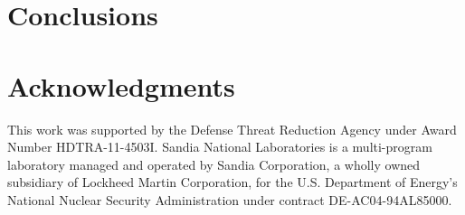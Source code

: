\documentclass[review,3p]{elsarticle}
\begin{document}
\section{Conclusions} \label{s:conclusions}

\lipsum[1]


\section*{Acknowledgments}
This work was supported by the Defense Threat Reduction Agency under Award
Number HDTRA-11-4503I.  Sandia National Laboratories is a multi-program
laboratory managed and operated by Sandia Corporation, a wholly owned
subsidiary of Lockheed Martin Corporation, for the U.S. Department of Energy's
National Nuclear Security Administration under contract DE-AC04-94AL85000.





\end{document}

